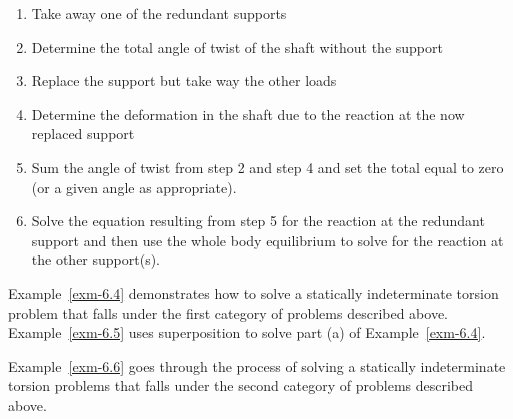\documentclass[
  letterpaper,
  DIV=11,
  numbers=noendperiod]{scrreprt}
\providecommand{\tightlist}{%
  \setlength{\itemsep}{0pt}\setlength{\parskip}{0pt}}\usepackage{longtable,booktabs,array}
\theoremstyle{definition}
\theoremstyle{remark}
\begin{document}
\begin{enumerate}
\def\labelenumi{\arabic{enumi}.}
\tightlist
\item
  Take away one of the redundant supports
\item
  Determine the total angle of twist of the shaft without the support
\item
  Replace the support but take way the other loads
\item
  Determine the deformation in the shaft due to the reaction at the now
  replaced support
\item
  Sum the angle of twist from step 2 and step 4 and set the total equal
  to zero (or a given angle as appropriate).
\item
  Solve the equation resulting from step 5 for the reaction at the
  redundant support and then use the whole body equilibrium to solve for
  the reaction at the other support(s).
\end{enumerate}

Example~\ref{exm-6.4} demonstrates how to solve a statically
indeterminate torsion problem that falls under the first category of
problems described above. Example~\ref{exm-6.5} uses superposition to
solve part (a) of Example~\ref{exm-6.4}.

Example~\ref{exm-6.6} goes through the process of solving a statically
indeterminate torsion problems that falls under the second category of
problems described above.
\end{document}

